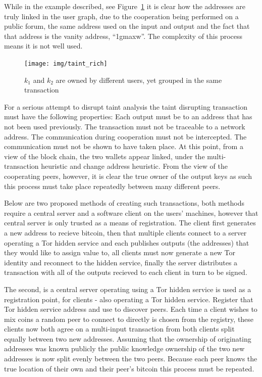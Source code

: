 While in the example described, see Figure~\ref{fig:taint-rich} it is clear how the addresses are truly linked in the user graph, due to the cooperation being performed on a public forum, the same address used on the input and output and the fact that that address is the vanity address, ``1gmaxw''. The complexity of this process means it is not well used.

\begin{figure}[t!]
    \centering
    \texttt{[image: img/taint\_rich]}
      \caption{$k_1$ and $k_2$ are owned by different users, yet grouped in the same transaction}
    \label{fig:taint-rich}
\end{figure}

For a serious attempt to disrupt taint analysis the taint disrupting transaction must have the following properties:  Each output must be to an address that has not been used previously. The transaction must not be traceable to a network address.  The communication during cooperation must not be intercepted. The communication must not be shown to have taken place.  At this point, from a view of the block chain, the two wallets appear linked, under the multi-transaction heuristic and change address heuristic. From the view of the cooperating peers, however, it is clear the true owner of the output keys as such this process must take place repeatedly between many different peers.

Below are two proposed methods of creating such transactions, both methods require a central server and a software client on the users' machines, however that central server is only trusted as a means of registration.  The client first generates a new address to recieve bitcoin, then that multiple clients connect to a server operating a Tor hidden service and each publishes outputs (the addresses) that they would like to assign value to, all clients must now generate a new Tor identity and reconnect to the hidden service, finally the server distributes a transaction with all of the outputs recieved to each client in turn to be signed.

The second, is a central server operating using a Tor hidden service is used as a registration point, for clients - also operating a Tor hidden service. Register that Tor hidden service address and use to discover peers.  Each time a client wishes to mix coins a random peer to connect to directly is chosen from the registry, these clients now both agree on a multi-input transaction from both clients split equally between two new addresses. Assuming that the ownership of originating addresses was known publicly the public knowledge ownership of the two new addresses is now split evenly between the two peers.  Because each peer knows the true location of their own and their peer's bitcoin this process must be repeated.

